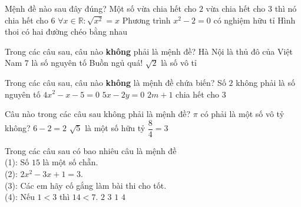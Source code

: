 \begin{ex}%
	Mệnh đề nào sau đây đúng? 
	\choice 
		{\True Một số vừa chia hết cho $2$ vừa chia hết  cho $3$ thì nó chia hết cho $6$}
		{$\forall x\in \mathbb{R}:\sqrt{x^2}=x$} 
		{Phương trình $x^2-2=0$ có nghiệm hữu tỉ} 
		{Hình thoi có hai đường chéo bằng nhau} 
\end{ex}

\begin{ex}%
	Trong các câu sau, câu nào  \textbf{không} phải là mệnh đề?
	 \choice
		{Hà Nội là thủ đô  của Việt Nam}
		{$7$  là số nguyên tố}
		{\True Buồn ngủ quá!} 
		{$\sqrt{2}$ là  số vô tỉ}
\end{ex}

\begin{ex}%
	Trong các câu sau, câu nào \textbf{không} là  mệnh đề chứa biến?
	\choice 
		{\True Số  $2$ không phải là số nguyên tố}
		{$4x^2-x-5=0$} 
		 {$5x-2y=0$}
		{$2m+1$  chia hết cho $3$}
\end{ex}

\begin{ex}%
	Câu nào trong các  câu sau không phải là mệnh đề?
	\choice 
		 {\True $\pi$ có phải là một số vô tỷ không?}
		{$6-2=2$} 
		{$\sqrt{5}$ là một số hữu  tỷ}
		{$\dfrac{8}{4}=3$} 
\end{ex}

\begin{ex}%
	Trong các câu sau có bao nhiêu câu  là mệnh đề\\
	(1): Số $15$ là  một số chẵn.\\
	(2): $2x^2-3x+1=3$.\\ 
	(3): Các em hãy cố gắng  làm bài thi cho tốt.\\
	(4): Nếu  $1< 3$ thì $14< 7$.
	 \choice
		 {\True $2$}
		 {$3$}
		 {$1$}
		 {$4$}
\end{ex}

